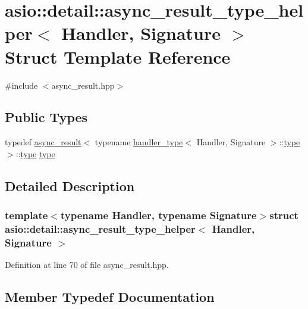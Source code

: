 \hypertarget{structasio_1_1detail_1_1async__result__type__helper}{}\section{asio\+:\+:detail\+:\+:async\+\_\+result\+\_\+type\+\_\+helper$<$ Handler, Signature $>$ Struct Template Reference}
\label{structasio_1_1detail_1_1async__result__type__helper}


{\ttfamily \#include $<$async\+\_\+result.\+hpp$>$}

\subsection*{Public Types}
\begin{DoxyCompactItemize}
\item 
typedef \hyperlink{classasio_1_1async__result}{async\+\_\+result}$<$ typename \hyperlink{structasio_1_1handler__type}{handler\+\_\+type}$<$ Handler, Signature $>$\+::\hyperlink{structasio_1_1detail_1_1async__result__type__helper_ab4aec755509972e47a6ea9d6f88b5b74}{type} $>$\+::\hyperlink{structasio_1_1detail_1_1async__result__type__helper_ab4aec755509972e47a6ea9d6f88b5b74}{type} \hyperlink{structasio_1_1detail_1_1async__result__type__helper_ab4aec755509972e47a6ea9d6f88b5b74}{type}
\end{DoxyCompactItemize}


\subsection{Detailed Description}
\subsubsection*{template$<$typename Handler, typename Signature$>$struct asio\+::detail\+::async\+\_\+result\+\_\+type\+\_\+helper$<$ Handler, Signature $>$}



Definition at line 70 of file async\+\_\+result.\+hpp.



\subsection{Member Typedef Documentation}
\hypertarget{structasio_1_1detail_1_1async__result__type__helper_ab4aec755509972e47a6ea9d6f88b5b74}{}
